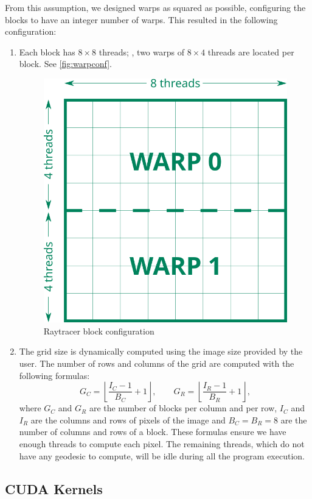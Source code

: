 From this assumption, we designed warps as squared as possible, configuring the blocks to have an integer number of warps. This resulted in the following configuration:
\begin{enumerate}
	\item Each block has $8\times8$ threads; \ie, two warps of $8\times4$ threads are located per block. See \autoref{fig:warpconf}.
	\begin{figure}[bth]
		\myfloatalign
		\includegraphics[width=.5\linewidth]{gfx/warpconf.png}
		\caption[Raytracer block configuration]{Raytracer block configuration}
		\label{fig:warpconf}
	\end{figure}
	\item The grid size is dynamically computed using the image size provided by the user. The number of rows and columns of the grid are computed with the following formulas:
	\begin{equation*}
	G_C = \left \lfloor{\frac{I_C - 1}{B_C} + 1}\right \rfloor, \qquad
	G_R = \left \lfloor{\frac{I_R - 1}{B_R} + 1}\right \rfloor,
	\end{equation*}
	where $G_C$ and $G_R$ are the number of blocks per column and per row, $I_C$ and $I_R$ are the columns and rows of pixels of the image and $B_C = B_R = 8$ are the number of columns and rows of a block. These formulas ensure we have enough threads to compute each pixel. The remaining threads, which do not have any geodesic to compute, will be idle during all the program execution.
\end{enumerate}

\subsection{CUDA Kernels}

